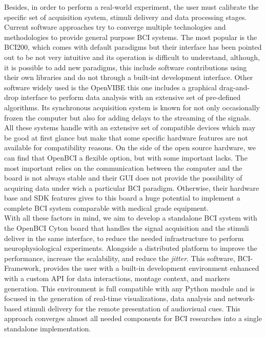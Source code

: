 Besides, in order to perform a real-world experiment, the user must calibrate the specific set of acquisition system, stimuli delivery and data processing stages. Current software approaches try to converge multiple technologies and methodologies to provide general purpose \gls*{BCI} systems. The most popular is the BCI200, which comes with default paradigms but their interface has been pointed out to be not very intuitive and its operation is difficult to understand, although, it is possible to add new paradigms, this include software contributions using their own libraries and do not through a built-int development interface. Other software widely used is the OpenVIBE this one includes a graphical drag-and-drop interface to perform data analysis with an extensive set of pre-defined algorithms. Its synchronous acquisition system is known for not only occasionally frozen the computer but also for adding delays to the streaming of the signals. All these systems handle with an extensive set of compatible devices which may be good at first glance but make that some specific hardware features are not available for compatibility reasons. On the side of the open source hardware, we can find that OpenBCI a flexible option, but with some important lacks. The most important relies on the communication between the computer and the board is not always stable and their \gls*{GUI} does not provide the possibility of acquiring data under wich a particular \gls*{BCI} paradigm. Otherwise, their hardware base and \gls*{SDK} features gives to this board a huge potential to implement a complete \gls*{BCI} system comparable with medical grade equipment.\\

With all these factors in mind, we aim to develop a standalone \gls*{BCI} system with the OpenBCI Cyton board that handles the signal acquisition and the stimuli deliver in the same interface, to reduce the needed infrastructure to perform neurophysiological experiments. Alongside a distributed platform to improve the performance, increase the scalability, and reduce the \textit{jitter}. This software, BCI-Framework, provides the user with a built-in development environment enhanced with a custom API for data interactions, montage context, and markers generation. This environment is full compatible with any Python module and is focused in the generation of real-time visualizations, data analysis and network-based stimuli delivery for the remote presentation of audiovisual cues. This approach converges almost all needed components for \gls*{BCI} researches into a single standalone implementation.\\

